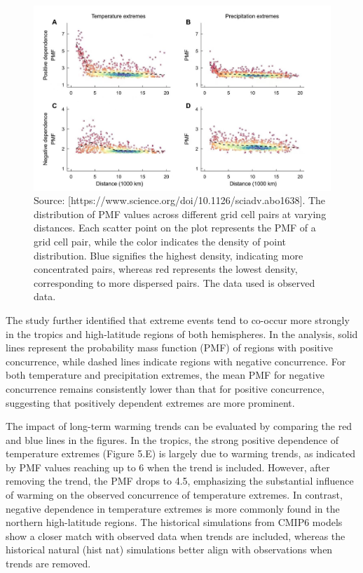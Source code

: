 \documentclass[
]{krantz}
\begin{document}
\vspace{1em}
\begin{figure}

{\centering \includegraphics[width=0.8\linewidth]{work/06-anthropo/figures/distance} 

}

\caption{Source: [https://www.science.org/doi/10.1126/sciadv.abo1638]. The distribution of PMF values across different grid cell pairs at varying distances. Each scatter point on the plot represents the PMF of a grid cell pair, while the color indicates the density of point distribution. Blue signifies the highest density, indicating more concentrated pairs, whereas red represents the lowest density, corresponding to more dispersed pairs. The data used is observed data.}\label{fig:unnamed-chunk-9}
\end{figure}
\vspace{1em}

The study further identified that extreme events tend to co-occur more strongly in the tropics and high-latitude regions of both hemispheres. In the analysis, solid lines represent the probability mass function (PMF) of regions with positive concurrence, while dashed lines indicate regions with negative concurrence. For both temperature and precipitation extremes, the mean PMF for negative concurrence remains consistently lower than that for positive concurrence, suggesting that positively dependent extremes are more prominent.

The impact of long-term warming trends can be evaluated by comparing the red and blue lines in the figures. In the tropics, the strong positive dependence of temperature extremes (Figure 5.E) is largely due to warming trends, as indicated by PMF values reaching up to 6 when the trend is included. However, after removing the trend, the PMF drops to 4.5, emphasizing the substantial influence of warming on the observed concurrence of temperature extremes. In contrast, negative dependence in temperature extremes is more commonly found in the northern high-latitude regions. The historical simulations from CMIP6 models show a closer match with observed data when trends are included, whereas the historical natural (hist nat) simulations better align with observations when trends are removed.
\end{document}
